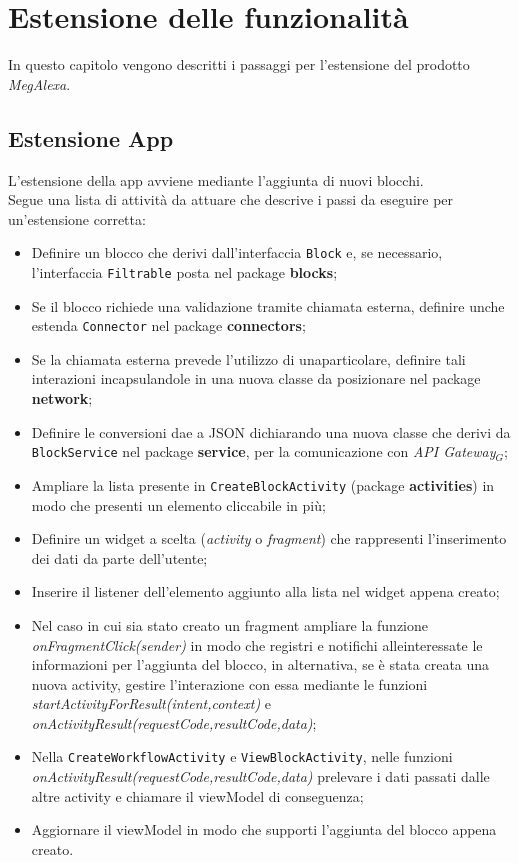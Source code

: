 \chapter{Estensione delle funzionalità}\label{estensione}
In questo capitolo vengono descritti i passaggi per l'estensione del prodotto \textit{MegAlexa}.

\section{Estensione App}
L'estensione della app avviene mediante l'aggiunta di nuovi blocchi.\\
Segue una lista di attività da attuare che descrive i passi da eseguire per un'estensione corretta:

\begin{itemize}
	\item Definire un blocco che derivi dall'interfaccia \texttt{Block} e, se necessario, l'interfaccia \texttt{Filtrable} posta nel package \textbf{blocks};
	\item Se il blocco richiede una validazione tramite chiamata esterna, definire unche estenda \texttt{Connector} nel package \textbf{connectors};
	\item Se la chiamata esterna prevede l'utilizzo di unaparticolare, definire tali interazioni incapsulandole in una nuova classe da posizionare nel package \textbf{network};
	\item Definire le conversioni dae a JSON dichiarando una nuova classe che derivi da \texttt{BlockService} nel package \textbf{service}, per la comunicazione con \textit{API Gateway$_{G}$};
	\item Ampliare la lista presente in \texttt{CreateBlockActivity} (package \textbf{activities}) in modo che presenti un elemento cliccabile in più;
	\item Definire un widget a scelta (\textit{activity} o \textit{fragment}) che rappresenti l'inserimento dei dati da parte dell'utente;
	\item Inserire il listener dell'elemento aggiunto alla lista nel widget appena creato;
	\item Nel caso in cui sia stato creato un fragment ampliare la funzione \textit{onFragmentClick(sender)} in modo che registri e notifichi alleinteressate le informazioni per l'aggiunta del blocco, in alternativa, se è stata creata una nuova activity, gestire l'interazione con essa mediante le funzioni \textit{startActivityForResult(intent,context)} e \textit{onActivityResult(requestCode,resultCode,data)};
	\item Nella \texttt{CreateWorkflowActivity} e \texttt{ViewBlockActivity}, nelle funzioni \textit{onActivityResult(requestCode,resultCode,data)} 	prelevare i dati passati dalle altre activity e chiamare il viewModel di conseguenza;
	\item Aggiornare il viewModel in modo che supporti l'aggiunta del blocco appena creato.
\end{itemize}



